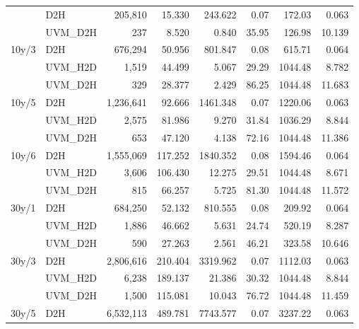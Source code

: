 \begin{table}[t]
{\begin{tabular}{llrrrrrr}
   & D2H & 205,810 & 15.330 & 243.622 & 0.07 & 172.03 & 0.063 \\
   & UVM_D2H & 237 & 8.520 & 0.840 & 35.95 & 126.98 & 10.139 \\
  \midrule
  10y/3%
   & D2H & 676,294 & 50.956 & 801.847 & 0.08 & 615.71 & 0.064 \\
   & UVM_H2D & 1,519 & 44.499 & 5.067 & 29.29 & 1044.48 & 8.782 \\
   & UVM_D2H & 329 & 28.377 & 2.429 & 86.25 & 1044.48 & 11.683 \\
  \midrule
  10y/5%
   & D2H & 1,236,641 & 92.666 & 1461.348 & 0.07 & 1220.06 & 0.063 \\
   & UVM_H2D & 2,575 & 81.986 & 9.270 & 31.84 & 1036.29 & 8.844 \\
   & UVM_D2H & 653 & 47.120 & 4.138 & 72.16 & 1044.48 & 11.386 \\
  \midrule
  10y/6%
   & D2H & 1,555,069 & 117.252 & 1840.352 & 0.08 & 1594.46 & 0.064 \\
   & UVM_H2D & 3,606 & 106.430 & 12.275 & 29.51 & 1044.48 & 8.671 \\
   & UVM_D2H & 815 & 66.257 & 5.725 & 81.30 & 1044.48 & 11.572 \\
  \midrule
  30y/1%
   & D2H & 684,250 & 52.132 & 810.555 & 0.08 & 209.92 & 0.064 \\
   & UVM_H2D & 1,886 & 46.662 & 5.631 & 24.74 & 520.19 & 8.287 \\
   & UVM_D2H & 590 & 27.263 & 2.561 & 46.21 & 323.58 & 10.646 \\
  \midrule
  30y/3%
   & D2H & 2,806,616 & 210.404 & 3319.962 & 0.07 & 1112.03 & 0.063 \\
   & UVM_H2D & 6,238 & 189.137 & 21.386 & 30.32 & 1044.48 & 8.844 \\
   & UVM_D2H & 1,500 & 115.081 & 10.043 & 76.72 & 1044.48 & 11.459 \\
  \midrule
  30y/5%
   & D2H & 6,532,113 & 489.781 & 7743.577 & 0.07 & 3237.22 & 0.063 \\

\end{tabular}}
\end{table}
